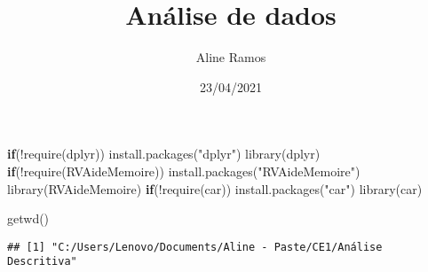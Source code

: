 \documentclass[
]{article}
\title{Análise de dados}
\author{Aline Ramos}
\date{23/04/2021}
\newenvironment{Shaded}{\begin{snugshade}}{\end{snugshade}}
\newcommand{\AttributeTok}[1]{\textcolor[rgb]{0.77,0.63,0.00}{#1}}
\newcommand{\ControlFlowTok}[1]{\textcolor[rgb]{0.13,0.29,0.53}{\textbf{#1}}}
\newcommand{\DecValTok}[1]{\textcolor[rgb]{0.00,0.00,0.81}{#1}}
\newcommand{\FunctionTok}[1]{\textcolor[rgb]{0.00,0.00,0.00}{#1}}
\newcommand{\NormalTok}[1]{#1}
\newcommand{\OtherTok}[1]{\textcolor[rgb]{0.56,0.35,0.01}{#1}}
\newcommand{\SpecialCharTok}[1]{\textcolor[rgb]{0.00,0.00,0.00}{#1}}
\newcommand{\StringTok}[1]{\textcolor[rgb]{0.31,0.60,0.02}{#1}}
\begin{document}
\maketitle

\begin{Shaded}
\begin{Highlighting}[]
\ControlFlowTok{if}\NormalTok{(}\SpecialCharTok{!}\FunctionTok{require}\NormalTok{(dplyr)) }\FunctionTok{install.packages}\NormalTok{(}\StringTok{"dplyr"}\NormalTok{) }
\FunctionTok{library}\NormalTok{(dplyr)                                }
\ControlFlowTok{if}\NormalTok{(}\SpecialCharTok{!}\FunctionTok{require}\NormalTok{(RVAideMemoire)) }\FunctionTok{install.packages}\NormalTok{(}\StringTok{"RVAideMemoire"}\NormalTok{) }
\FunctionTok{library}\NormalTok{(RVAideMemoire)                                        }
\ControlFlowTok{if}\NormalTok{(}\SpecialCharTok{!}\FunctionTok{require}\NormalTok{(car)) }\FunctionTok{install.packages}\NormalTok{(}\StringTok{"car"}\NormalTok{) }
\FunctionTok{library}\NormalTok{(car)                                }

\FunctionTok{getwd}\NormalTok{() }
\end{Highlighting}
\end{Shaded}

\begin{verbatim}
## [1] "C:/Users/Lenovo/Documents/Aline - Paste/CE1/Análise Descritiva"
\end{verbatim}

\begin{Shaded}
\end{Shaded}
\end{document}
